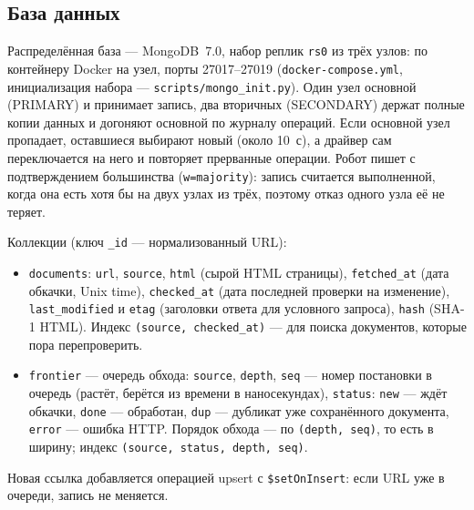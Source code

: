 \subsection{База данных}
Распределённая база --- MongoDB~7.0, набор реплик \texttt{rs0} из трёх узлов: по контейнеру Docker на узел, порты 27017--27019 (\texttt{docker-compose.yml}, инициализация набора --- \texttt{scripts/mongo\_init.py}). Один узел основной (PRIMARY) и принимает запись, два вторичных (SECONDARY) держат полные копии данных и догоняют основной по журналу операций. Если основной узел пропадает, оставшиеся выбирают новый (около 10~с), а драйвер сам переключается на него и повторяет прерванные операции. Робот пишет с подтверждением большинства (\texttt{w=majority}): запись считается выполненной, когда она есть хотя бы на двух узлах из трёх, поэтому отказ одного узла её не теряет.

Коллекции (ключ \texttt{\_id} --- нормализованный URL):
\begin{itemize}
    \item \texttt{documents}: \texttt{url}, \texttt{source}, \texttt{html} (сырой HTML страницы), \texttt{fetched\_at} (дата обкачки, Unix time), \texttt{checked\_at} (дата последней проверки на изменение), \texttt{last\_modified} и \texttt{etag} (заголовки ответа для условного запроса), \texttt{hash} (SHA-1 HTML). Индекс \texttt{(source, checked\_at)} --- для поиска документов, которые пора перепроверить.
    \item \texttt{frontier} --- очередь обхода: \texttt{source}, \texttt{depth}, \texttt{seq} --- номер постановки в очередь (растёт, берётся из времени в наносекундах), \texttt{status}: \texttt{new} --- ждёт обкачки, \texttt{done} --- обработан, \texttt{dup} --- дубликат уже сохранённого документа, \texttt{error} --- ошибка HTTP. Порядок обхода --- по \texttt{(depth, seq)}, то есть в ширину; индекс \texttt{(source, status, depth, seq)}.
\end{itemize}
Новая ссылка добавляется операцией upsert с \texttt{\$setOnInsert}: если URL уже в очереди, запись не меняется.


